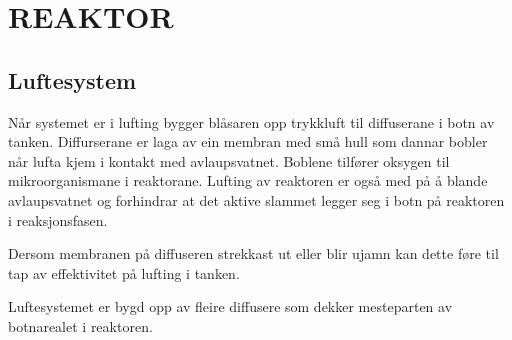 \newpage
\section{REAKTOR}
\subsection{Luftesystem}
Når systemet er i lufting bygger blåsaren opp trykkluft til diffuserane i botn av tanken. 
Diffurserane er laga av ein membran med små hull som dannar bobler når lufta kjem i kontakt med avlaupsvatnet. Boblene tilfører oksygen til mikroorganismane i reaktorane. 
Lufting av reaktoren er også med på å blande avlaupsvatnet og forhindrar at det aktive slammet legger seg i botn på reaktoren i reaksjonsfasen.

Dersom membranen på diffuseren strekkast ut eller blir ujamn kan dette føre til tap av effektivitet på lufting i tanken.

Luftesystemet er bygd opp av fleire diffusere som dekker mesteparten av botnarealet i reaktoren.

